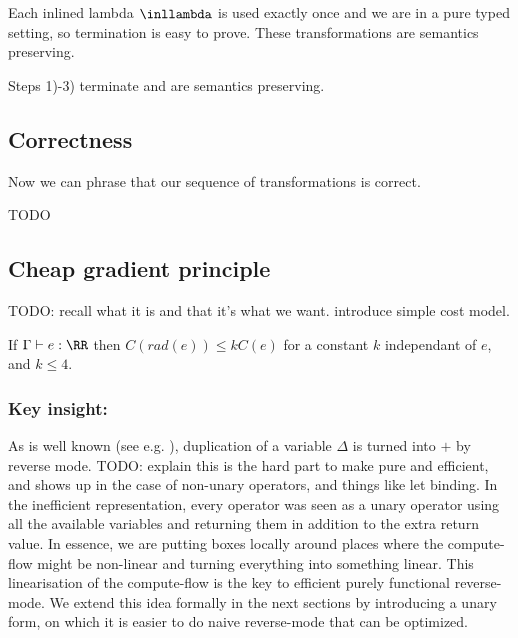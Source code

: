 Each inlined lambda $\inllambda$ is used exactly once and we are in a pure typed setting, so termination is easy to prove. These transformations are semantics preserving.

\begin{proposition}
	Steps 1)-3) terminate and are semantics preserving.
\end{proposition}

\subsection{Correctness}

Now we can phrase that our sequence of transformations is correct.

\begin{proposition}
    TODO
\end{proposition}

\subsection{Cheap gradient principle}

TODO: recall what it is and that it's what we want. introduce simple cost model.

\begin{proposition}
    If $\Gamma\vdash e:\RR$ then $C(rad(e))\leq k C(e)$ for a constant $k$ independant of $e$, and $k\leq4$.
\end{proposition}

\subsubsection*{Key insight:}

As is well known (see e.g. \cite{pearlmutter2008reverse}), duplication of a variable $\Delta$ is turned into $+$ by reverse mode.
TODO: explain this is the hard part to make pure and efficient, and shows up in the case of non-unary operators, and things like let binding.
In the inefficient representation, every operator was seen as a unary operator using all the available variables and returning them in addition to the extra return value. 
In essence, we are putting boxes locally around places where the compute-flow might be non-linear and turning everything into something linear.
This linearisation of the compute-flow is the key to efficient purely functional reverse-mode. We extend this idea formally in the next sections by introducing a unary form, 
on which it is easier to do naive reverse-mode that can be optimized. 